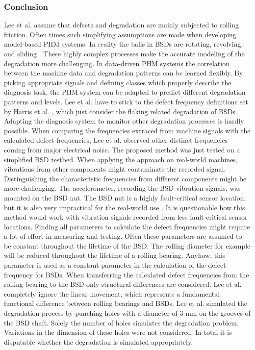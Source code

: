 \subsubsection{Conclusion}
Lee et al. assume that defects and degradation are mainly subjected to rolling friction. Often times such simplifying assumptions are made when developing model-based PHM systems. In reality the balls in BSDs are rotating, revolving, and sliding \cite{Lee2015}. These highly complex processes make the accurate modeling of the degradation more challenging. In data-driven PHM systems the correlation between the machine data and degradation patterns can be learned flexibly. By picking appropriate signals and defining classes which properly describe the diagnosis task, the PHM system can be adapted to predict different degradation patterns and levels. Lee et al. have to stick to the defect frequency definitions set by Harris et al. \cite{Harris1996}, which just consider the flaking related degradation of BSDs. Adapting the diagnosis system to monitor other degradation processes is hardly possible. When comparing the frequencies extraced from machine signals with the calculated defect frequencies, Lee et al. observed other distinct frequencies coming from major electrical noise. The proposed method was just tested on a simplified BSD testbed. When applying the approach on real-world machines, vibrations from other components might contaminate the recorded signal. Distinguishing the characteristic frequencies from different components might be more challenging. The accelerometer, recording the BSD vibration signals, was mounted on the BSD nut. The BSD nut is a highly fault-critical sensor location, but it is also very impractical for the real-world use \cite{Pandhare2021}. It is questionable how this method would work with vibration signals recorded from less fault-critical sensor locations. Finding all parameters to calculate the defect frequencies might require a lot of effort in measuring and testing. Often these parameters are assumed to be constant throughout the lifetime of the BSD. The rolling diameter for example will be reduced throughout the lifetime of a rolling bearing. Anyhow, this parameter is used as a constant parameter in the calculation of the defect frequency for BSDs. When transferring the calculated defect frequencies from the rolling bearing to the BSD only structural differences are considered. Lee et al. completely ignore the linear movement, which represents a fundamental functional difference between rolling bearings and BSDs. Lee et al. simulated the degradation process by punching holes with a diameter of 3 mm on the grooves of the BSD shaft. Solely the number of holes simulates the degradation problem. Variations in the dimension of these holes were not considered. In total it is disputable whether the degradation is simulated appropriately.  

